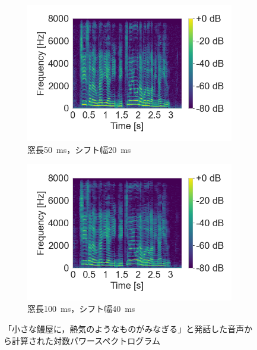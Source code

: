 \begin{figure}[tb]
    \begin{subfigure}[b]{0.48\textwidth}
        \centering
        \includegraphics[width=\textwidth]{./figure/sec2/spectrogram_4.png}
        \caption{窓長\SI{50}{\ms}，シフト幅\SI{20}{\ms}}
        \label{sec2:fig:spectrogram3}
    \end{subfigure}
    \begin{subfigure}[b]{0.48\textwidth}
        \centering
        \includegraphics[width=\textwidth]{./figure/sec2/spectrogram_8.png}
        \caption{窓長\SI{100}{\ms}，シフト幅\SI{40}{\ms}}
        \label{sec2:fig:spectrogram4}
    \end{subfigure}
    \caption{「小さな鰻屋に，熱気のようなものがみなぎる」と発話した音声から計算された対数パワースペクトログラム}
    \label{sec2:fig:log_power_spectrograms}
\end{figure}

